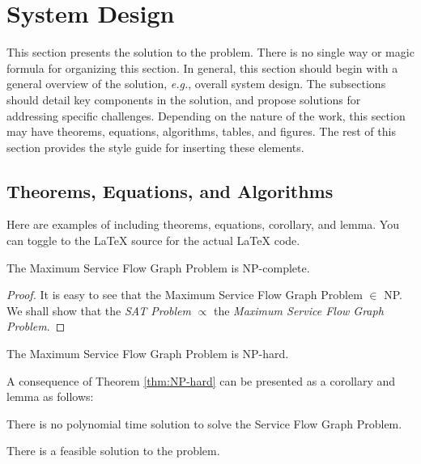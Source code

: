 \section{System Design}
\label{sec:design}

This section presents the solution to the problem.  There is no single way or magic formula for organizing this section.  In general, this section should begin with a general overview of the solution, {\em e.g.}, overall system design.  The subsections should detail key components in the solution, and propose solutions for addressing specific challenges.  Depending on the nature of the work, this section may have theorems, equations, algorithms, tables, and figures.  The rest of this section provides the style guide for inserting these elements.

\subsection{Theorems, Equations, and Algorithms}
\label{sec:design-alg}

Here are examples of including theorems, equations, corollary, and lemma.  You can toggle to the LaTeX source for the actual LaTeX code.


\begin{theorem}
\label{thm:NP-complete}
The Maximum Service Flow Graph Problem is NP-complete.
\end{theorem}

\begin{proof}
It is easy to see that the Maximum
Service Flow Graph Problem $\in$ NP.  We shall show that the  \textit{SAT Problem} $\propto$ the \textit{Maximum Service Flow Graph Problem}.
\end{proof}

\begin{theorem}
\label{thm:NP-hard}
The Maximum Service Flow Graph Problem is NP-hard.
\end{theorem}

A consequence of Theorem \ref{thm:NP-hard} can be presented as a corollary and lemma as follows:

\begin{corollary}
\label{col:polynomial}
There is no polynomial time solution to solve the Service Flow Graph Problem.
\end{corollary}

\begin{lemma}
\label{lem:solution}
There is a feasible solution to the problem.  
\end{lemma}

